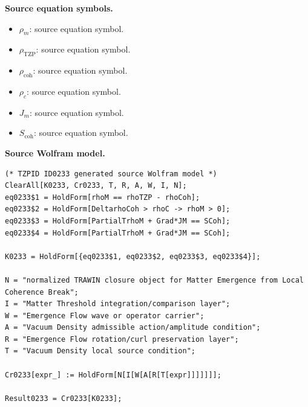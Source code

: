 \begin{minipage}[t]{0.49\linewidth}
\begingroup
\small
\raggedright
\textbf{Source equation symbols.}\par
\begin{itemize}[leftmargin=1.35em,itemsep=1pt,topsep=1pt,parsep=0pt]
    \item $\rho_m$: source equation symbol.
    \item $\rho_{\mathrm{TZP}}$: source equation symbol.
    \item $\rho_{\mathrm{coh}}$: source equation symbol.
    \item $\rho_c$: source equation symbol.
    \item $J_m$: source equation symbol.
    \item $S_{\mathrm{coh}}$: source equation symbol.
\end{itemize}
\endgroup
\end{minipage}\hfill
\begin{minipage}[t]{0.47\linewidth}
\begingroup
\scriptsize
\raggedright
\textbf{Source Wolfram model.}\par
\begin{Verbatim}[fontsize=\tiny,breaklines=true,breakanywhere=true]
(* TZPID ID0233 generated source Wolfram model *)
ClearAll[K0233, Cr0233, T, R, A, W, I, N];
eq0233$1 = HoldForm[rhoM == rhoTZP - rhoCoh];
eq0233$2 = HoldForm[DeltarhoCoh > rhoC -> rhoM > 0];
eq0233$3 = HoldForm[PartialTrhoM + Grad*JM == SCoh];
eq0233$4 = HoldForm[PartialTrhoM + Grad*JM == SCoh];

K0233 = HoldForm[{eq0233$1, eq0233$2, eq0233$3, eq0233$4}];

N = "normalized TRAWIN closure object for Matter Emergence from Local Coherence Break";
I = "Matter Threshold integration/comparison layer";
W = "Emergence Flow wave or operator carrier";
A = "Vacuum Density admissible action/amplitude condition";
R = "Emergence Flow rotation/curl preservation layer";
T = "Vacuum Density local source condition";

Cr0233[expr_] := HoldForm[N[I[W[A[R[T[expr]]]]]]];

Result0233 = Cr0233[K0233];
\end{Verbatim}
\endgroup
\end{minipage}

